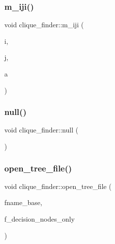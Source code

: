 \mbox{\label{classclique__finder_a71926c0ac21140c88acf24a8ed26246f}} 
\subsubsection{\texorpdfstring{m\+\_\+iji()}{m\_iji()}}
{\footnotesize\ttfamily void clique\+\_\+finder\+::m\+\_\+iji (\begin{DoxyParamCaption}\item[{\mbox{\hyperlink{galois_8h_a09fddde158a3a20bd2dcadb609de11dc}{I\+NT}}}]{i,  }\item[{\mbox{\hyperlink{galois_8h_a09fddde158a3a20bd2dcadb609de11dc}{I\+NT}}}]{j,  }\item[{\mbox{\hyperlink{galois_8h_a09fddde158a3a20bd2dcadb609de11dc}{I\+NT}}}]{a }\end{DoxyParamCaption})}

\mbox{\label{classclique__finder_af88651ad5d235f543c65f70004de44e3}} 
\subsubsection{\texorpdfstring{null()}{null()}}
{\footnotesize\ttfamily void clique\+\_\+finder\+::null (\begin{DoxyParamCaption}{ }\end{DoxyParamCaption})}

\mbox{\label{classclique__finder_a1f0e664ae854fb4815b066f254431cfe}} 
\subsubsection{\texorpdfstring{open\+\_\+tree\+\_\+file()}{open\_tree\_file()}}
{\footnotesize\ttfamily void clique\+\_\+finder\+::open\+\_\+tree\+\_\+file (\begin{DoxyParamCaption}\item[{const \mbox{\hyperlink{galois_8h_ab6cc7b4aeb6ea31aba2b3fbfc83ff5e6}{B\+Y\+TE}} $\ast$}]{fname\+\_\+base,  }\item[{\mbox{\hyperlink{galois_8h_a09fddde158a3a20bd2dcadb609de11dc}{I\+NT}}}]{f\+\_\+decision\+\_\+nodes\+\_\+only }\end{DoxyParamCaption})}

